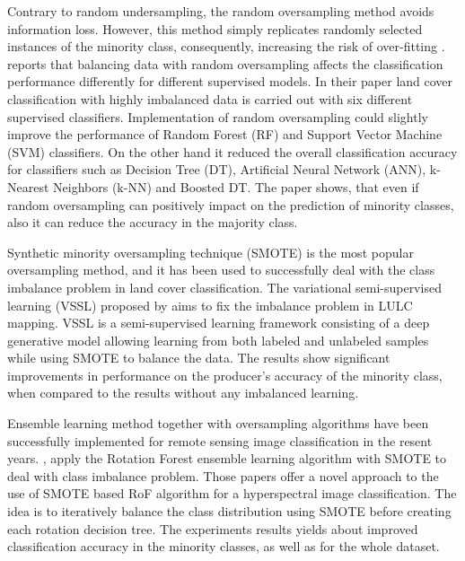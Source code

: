 \documentclass[parskip=full]{scrartcl}
\begin{document}
Contrary to random undersampling, the random oversampling method avoids 
information loss. However, this method simply replicates randomly selected 
instances of the minority class, consequently, increasing the risk of 
over-fitting \cite{Krawczyk2016}. \cite{Maxwell2018} reports that balancing 
data with random oversampling affects the classification performance 
differently for different supervised models. In their paper land cover 
classification with highly imbalanced data is carried out with six different 
supervised classifiers. Implementation of random oversampling could slightly 
improve the performance of Random Forest (RF) and Support Vector Machine (SVM) 
classifiers. On the other hand it reduced the overall classification accuracy 
for classifiers such as Decision Tree (DT), Artificial Neural Network (ANN), 
k-Nearest Neighbors (k-NN) and Boosted DT. The paper shows, that even if random 
oversampling can positively impact on the prediction of minority classes, 
also it can reduce the accuracy in the majority class.

Synthetic minority oversampling technique (SMOTE) \cite{Chawla2002} is the most 
popular oversampling method, and it has been used to successfully deal with the 
class imbalance problem in land cover classification. The variational 
semi-supervised learning (VSSL) proposed by \cite{Cenggoro2018} aims to fix the 
imbalance problem in LULC mapping. VSSL is a semi-supervised learning framework 
consisting of a deep generative model allowing learning from both labeled 
and unlabeled samples while using SMOTE to balance the data. The results show 
significant improvements in performance on the producer’s accuracy of the 
minority class, when compared to the results without any imbalanced learning. 

Ensemble learning method together with oversampling algorithms have been
successfully implemented for remote sensing image classification in the resent
years. \cite{Feng2018}, \cite{Feng2019} apply the Rotation Forest ensemble 
learning algorithm with SMOTE to deal with class imbalance problem. Those 
papers offer a novel approach to the use of SMOTE based RoF algorithm for a 
hyperspectral image classification. The idea is to iteratively balance the 
class distribution using SMOTE before creating each rotation decision tree. 
The experiments results yields about improved classification accuracy in the 
minority classes,  as well as for the whole dataset.
\end{document}
